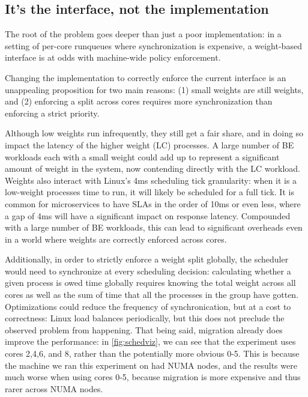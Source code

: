 \subsection{It's the interface, not the implementation}

The root of the problem goes deeper than just a poor implementation: in a
setting of per-core runqueues where synchronization is expensive, a weight-based
interface is at odds with machine-wide policy enforcement.

Changing the implementation to correctly enforce the current interface is an
unappealing proposition for two main reasons: (1) small weights are still
weights, and (2) enforcing a split across cores requires more synchronization
than enforcing a strict priority.

Although low weights run infrequently, they still get a fair share, and in doing
so impact the latency of the higher weight (LC) processes. A large number of BE
workloads each with a small weight could add up to represent a significant
amount of weight in the system, now contending directly with the LC workload.
Weights also interact with Linux's 4ms scheduling tick granularity: when it is a
low-weight processes time to run, it will likely be scheduled for a full tick.
It is common for microservices to have SLAs in the order of 10ms or even less,
where a gap of 4ms will have a significant impact on response latency.
Compounded with a large number of BE workloads, this can lead to significant
overheads even in a world where weights are correctly enforced across cores.

Additionally, in order to strictly enforce a weight split globally, the
scheduler would need to synchronize at every scheduling decision: calculating
whether a given process is owed time globally requires knowing the total weight
across all cores as well as the sum of time that all the processes in the group
have gotten. Optimizations could reduce the frequency of synchronication, but at
a cost to correctness: Linux load balances periodically, but this does not
preclude the observed problem from happening. That being said, migration already
does improve the performance: in \autoref{fig:schedviz}, we can see that the
experiment uses cores 2,4,6, and 8, rather than the potentially more obvious
0-5. This is because the machine we ran this experiment on had NUMA nodes, and
the results were much worse when using cores 0-5, because migration is more
expensive and thus rarer across NUMA nodes.




